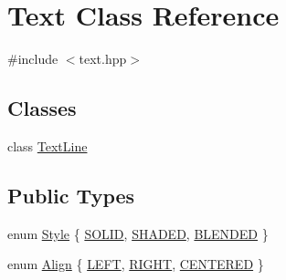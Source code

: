 \hypertarget{class_text}{\section{Text Class Reference}
\label{class_text}
}


{\ttfamily \#include $<$text.\-hpp$>$}

\subsection*{Classes}
\begin{DoxyCompactItemize}
\item 
class \hyperlink{class_text_1_1_text_line}{Text\-Line}
\end{DoxyCompactItemize}
\subsection*{Public Types}
\begin{DoxyCompactItemize}
\item 
enum \hyperlink{class_text_ac82ae440952fc1c8e10a16f81a593ce1}{Style} \{ \hyperlink{class_text_ac82ae440952fc1c8e10a16f81a593ce1abc6bd1bc8b9a92001a6b30259448fafe}{S\-O\-L\-I\-D}, 
\hyperlink{class_text_ac82ae440952fc1c8e10a16f81a593ce1a8eac34454b77764eff697e6f55f7906b}{S\-H\-A\-D\-E\-D}, 
\hyperlink{class_text_ac82ae440952fc1c8e10a16f81a593ce1aac6e9b56165c8afe563da5866b394f7b}{B\-L\-E\-N\-D\-E\-D}
 \}
\item 
enum \hyperlink{class_text_a93b1e85f0f6745446ed27cd708289339}{Align} \{ \hyperlink{class_text_a93b1e85f0f6745446ed27cd708289339ab4e62c417c456da191cbc9d563cf82bd}{L\-E\-F\-T}, 
\hyperlink{class_text_a93b1e85f0f6745446ed27cd708289339ae512ceb95e45275aaa14f027d4155352}{R\-I\-G\-H\-T}, 
\hyperlink{class_text_a93b1e85f0f6745446ed27cd708289339a35c76f89224d723030882a395fda58d6}{C\-E\-N\-T\-E\-R\-E\-D}
 \}
\end{DoxyCompactItemize}
